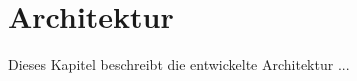 \section{Architektur}
\label{architecture}
Dieses Kapitel beschreibt die entwickelte Architektur ...

\pagebreak 